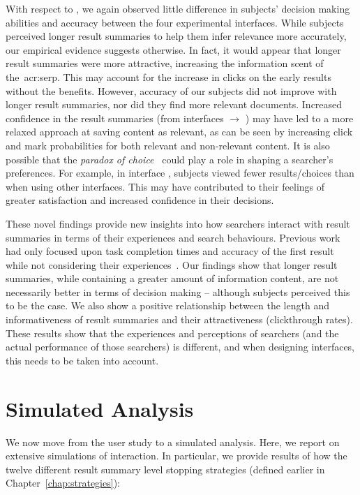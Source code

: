 With respect to , we again observed little difference in subjects' decision making abilities and accuracy between the four experimental interfaces. While subjects perceived longer result summaries to help them infer relevance more accurately, our empirical evidence suggests otherwise. In fact, it would appear that longer result summaries were more attractive, increasing the information scent of the~\gls{acr:serp}. This may account for the increase in clicks on the early results without the benefits. However, accuracy of our subjects did not improve with longer result summaries, nor did they find more relevant documents. Increased confidence in the result summaries (from interfaces  $\rightarrow$ ) may have led to a more relaxed approach at saving content as relevant, as can be seen by increasing click and mark probabilities for both relevant and non-relevant content. It is also possible that the \emph{paradox of choice}~\citep{oulasvirta2009serp_size} could play a role in shaping a searcher's preferences. For example, in interface , subjects viewed fewer results/choices than when using other interfaces. This may have contributed to their feelings of greater satisfaction and increased confidence in their decisions.

These novel findings provide new insights into how searchers interact with result summaries in terms of their experiences and search behaviours. Previous work had only focused upon task completion times and accuracy of the first result while not considering their experiences~\citep{cutrell2007eye_tracking, kaisser2008improving}. Our findings show that longer result summaries, while containing a greater amount of information content, are not necessarily better in terms of decision making -- although subjects perceived this to be the case. We also show a positive relationship between the length and informativeness of result summaries and their attractiveness (clickthrough rates). These results show that the experiences and perceptions of searchers (and the actual performance of those searchers) is different, and when designing interfaces, this needs to be taken into account.

\section{Simulated Analysis}\label{sec:snippets:simulations}
We now move from the user study to a simulated analysis. Here, we report on extensive simulations of interaction. In particular, we provide results of how the twelve different result summary level stopping strategies (defined earlier in Chapter~\ref{chap:strategies}):

